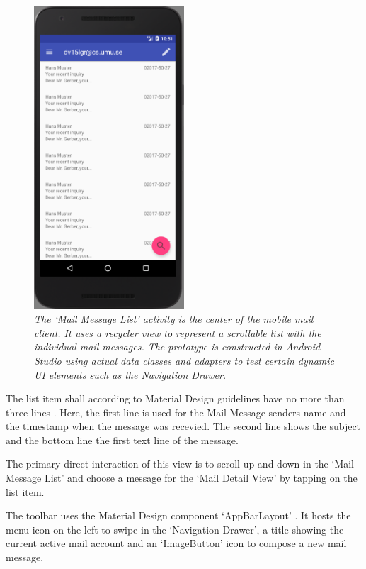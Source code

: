 \documentclass[a4paper,11pt,twoside]{article}
\begin{document}
\begin{figure}[hp!]

  \centering
    \includegraphics[width=0.5\textwidth]{mail_message_list}
    \caption{\textit{The `Mail Message List' activity is the center of the
    mobile mail client. It uses a recycler view to represent a scrollable
    list with the individual mail messages. The prototype is constructed
    in Android Studio using actual data classes and adapters to test
    certain dynamic UI elements such as the Navigation Drawer.}}
    \label{fig:mail_message_list}
\end{figure}

The list item shall according to Material Design guidelines have no more
than  three lines \cite{material_lists}. Here, the first line is used for the
Mail Message senders name and the timestamp when the message was recevied. The
second line shows the subject and the bottom line the first text line of the
message.

The primary direct interaction of this view is to scroll up and down in the
`Mail Message List' and choose a message for the `Mail Detail View' by tapping
on the list item.

The toolbar uses the Material Design component `AppBarLayout'
\cite{appbar_layout}. It hosts the menu icon on the left to swipe in the
`Navigation Drawer', a title showing the current active mail account and an
`ImageButton' icon to compose a new mail message.
\end{document}
